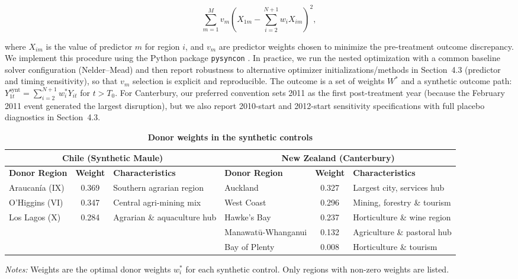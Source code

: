 \documentclass[12pt]{article}
\begin{document}
$$ \sum_{m=1}^M v_m (X_{1m} - \sum_{i=2}^{N+1} w_i X_{im})^2,$$ 

where $X_{im}$ is the value of predictor $m$ for region $i$, and $v_m$ are predictor weights chosen to minimize the pre-treatment outcome discrepancy. We implement this procedure using the Python package \texttt{pysyncon} \parencite{pysynconpackage}. In practice, we run the nested optimization with a common baseline solver configuration (Nelder--Mead) and then report robustness to alternative optimizer initializations/methods in Section~4.3 (predictor and timing sensitivity), so that $v_m$ selection is explicit and reproducible. The outcome is a set of weights $W^{*}$ and a synthetic outcome path: $Y_{1t}^{\text{synt}} = \sum_{i=2}^{N+1} w_i^{*} Y_{it}$ for $t > T_0$. For Canterbury, our preferred convention sets 2011 as the first post-treatment year (because the February 2011 event generated the largest disruption), but we also report 2010-start and 2012-start sensitivity specifications with full placebo diagnostics in Section~4.3.

\begin{table}[H]
\centering
\singlespacing
\caption{\textbf{Donor weights in the synthetic controls}}
\label{tab:weights}
\small
\setlength{\tabcolsep}{4pt} %
\begin{threeparttable}
\begin{tabular}{lc p{3.2cm} | lc p{3.2cm}}
\toprule
\multicolumn{3}{c|}{\textbf{Chile (Synthetic Maule)}} & \multicolumn{3}{c}{\textbf{New Zealand (Canterbury)}} \\
\midrule
\textbf{Donor Region} & \textbf{Weight} & \textbf{Characteristics} & \textbf{Donor Region} & \textbf{Weight} & \textbf{Characteristics} \\
\midrule
Araucanía (IX)  & 0.369 & Southern agrarian region      & Auckland           & 0.327 & Largest city, services hub \\
O'Higgins (VI)  & 0.347 & Central agri-mining mix       & West Coast         & 0.296 & Mining, forestry \& tourism \\
Los Lagos (X)   & 0.284 & Agrarian \& aquaculture hub   & Hawke's Bay        & 0.237 & Horticulture \& wine region \\
                &       &                               & Manawatū-Whanganui & 0.132 & Agriculture \& pastoral hub \\
                &       &                               & Bay of Plenty      & 0.008 & Horticulture \& tourism \\
\bottomrule
\end{tabular}
\begin{tablenotes}[flushleft]\footnotesize
\item \textit{Notes:} Weights are the optimal donor weights $w_i^{*}$ for each synthetic control. Only regions with non-zero weights are listed.
\end{tablenotes}
\end{threeparttable}
\end{table}
\end{document}
